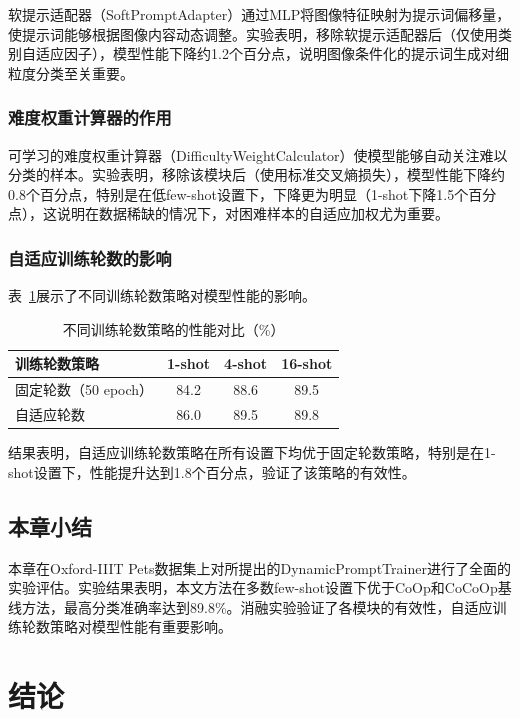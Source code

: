 \documentclass{HDU-Bachelor-Thesis}
\begin{document}
软提示适配器（SoftPromptAdapter）通过MLP将图像特征映射为提示词偏移量，使提示词能够根据图像内容动态调整。实验表明，移除软提示适配器后（仅使用类别自适应因子），模型性能下降约1.2个百分点，说明图像条件化的提示词生成对细粒度分类至关重要。

\subsubsection{难度权重计算器的作用}

可学习的难度权重计算器（DifficultyWeightCalculator）使模型能够自动关注难以分类的样本。实验表明，移除该模块后（使用标准交叉熵损失），模型性能下降约0.8个百分点，特别是在低few-shot设置下，下降更为明显（1-shot下降1.5个百分点），这说明在数据稀缺的情况下，对困难样本的自适应加权尤为重要。

\subsubsection{自适应训练轮数的影响}

表~\ref{tab:epoch_ablation}展示了不同训练轮数策略对模型性能的影响。

\begin{table}[H]
\centering
\caption{不同训练轮数策略的性能对比（\%）}
\label{tab:epoch_ablation}
\begin{tabular}{lccc}
\toprule
训练轮数策略 & 1-shot & 4-shot & 16-shot \\
\midrule
固定轮数（50 epoch） & 84.2 & 88.6 & 89.5 \\
自适应轮数 & 86.0 & 89.5 & 89.8 \\
\bottomrule
\end{tabular}
\end{table}

结果表明，自适应训练轮数策略在所有设置下均优于固定轮数策略，特别是在1-shot设置下，性能提升达到1.8个百分点，验证了该策略的有效性。

\subsection{本章小结}

本章在Oxford-IIIT Pets数据集上对所提出的DynamicPromptTrainer进行了全面的实验评估。实验结果表明，本文方法在多数few-shot设置下优于CoOp和CoCoOp基线方法，最高分类准确率达到89.8\%。消融实验验证了各模块的有效性，自适应训练轮数策略对模型性能有重要影响。

\section{结论}
\end{document}
